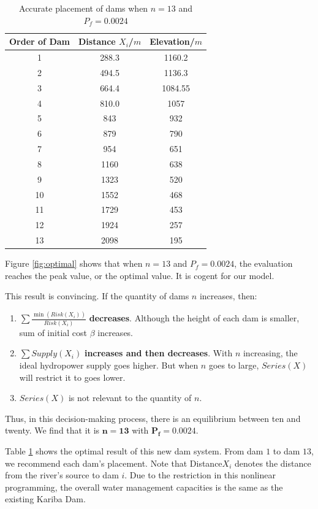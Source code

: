 \documentclass{mcmthesis}
\begin{document}
\begin{table}
    \centering
    \caption{Accurate placement of dams when $n=13$ and $P_f = 0.0024$}
    \label{tab:placement}
    \begin{tabular}{c c c}
\hline
    	Order of Dam & Distance $X_i$/$m$ & Elevation/$m$\\
\hline
	1&288.3	&1160.2\\
	2&494.5	&1136.3\\
	3&664.4	&1084.55\\
	4&810.0	&1057\\
	5&843	&932\\
	6&879	&790\\
	7&954	&651\\
	8&1160&	638\\
	9&1323&	520\\
	10&1552&	468\\
	11&1729&	453\\
	12&1924&	257\\
	13&2098&	195\\
\hline
    \end{tabular}
\end{table}

Figure \ref{fig:optimal} shows that when $n=13$ and $P_f=0.0024$, the evaluation reaches the peak value, or the optimal value. It is cogent for our model.

This result is convincing. If the quantity of dams $n$ increases, then:
\begin{enumerate}
\item $\sum \frac{\min(Risk(X_i))}{Risk(X_i)}$ \textbf{decreases}. Although the height of each dam is smaller, sum of initial cost $\beta$ increases.
\item $\sum Supply(X_i)$ \textbf{increases and then decreases}. With $n$ increasing, the ideal hydropower supply goes higher. But when $n$ goes to large, $Series(X)$ will restrict it to goes lower.
\item $Series(X)$ is not relevant to the quantity of $n$.
\end{enumerate}

Thus, in this decision-making process, there is an equilibrium between ten and twenty. We find that it is $\mathbf{n=13}$ with $\mathbf{P_f=0.0024}$.

Table \ref{tab:placement} shows the optimal result of this new dam system. From dam $1$ to dam $13$, we recommend each dam's placement. Note that Distance$X_i$ denotes the distance from the river's source to dam $i$. Due to the restriction in this nonlinear programming, the overall water management capacities is the same as the existing Kariba Dam.
\end{document}
